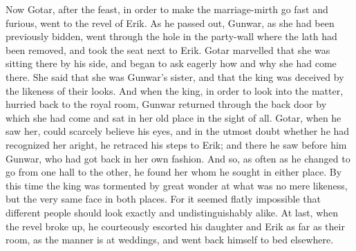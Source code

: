 \documentclass[10pt,a4paper]{report}
\begin{document}
Now Gotar, after the feast, in order to make the marriage-mirth go fast and furious, went to the revel of Erik. As he passed out, Gunwar, as she had been previously bidden, went through the hole in the party-wall where the lath had been removed, and took the seat next to Erik. Gotar marvelled that she was sitting there by his side, and began to ask eagerly how and why she had come there. She said that she was Gunwar's sister, and that the king was deceived by the likeness of their looks. And when the king, in order to look into the matter, hurried back to the royal room, Gunwar returned through the back door by which she had come and sat in her old place in the sight of all. Gotar, when he saw her, could scarcely believe his eyes, and in the utmost doubt whether he had recognized her aright, he retraced his steps to Erik; and there he saw before him Gunwar, who had got back in her own fashion. And so, as often as he changed to go from one hall to the other, he found her whom he sought in either place. By this time the king was tormented by great wonder at what was no mere likeness, but the very same face in both places. For it seemed flatly impossible that different people should look exactly and undistinguishably alike. At last, when the revel broke up, he courteously escorted his daughter and Erik as far as their room, as the manner is at weddings, and went back himself to bed elsewhere.\\
\end{document}
